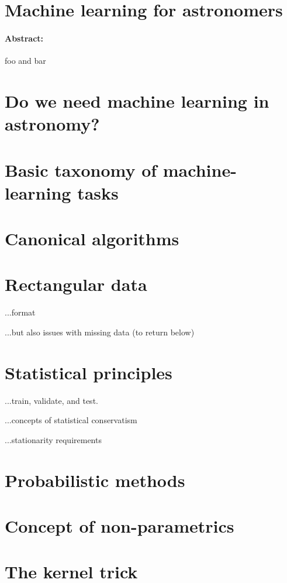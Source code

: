\documentclass[12pt, letterpaper]{article}
\begin{document}
\section*{Machine learning for astronomers}

\paragraph{Abstract:} foo and bar

\section{Do we need machine learning in astronomy?}

\section{Basic taxonomy of machine-learning tasks}

\section{Canonical algorithms}

\section{Rectangular data}

...format

...but also issues with missing data (to return below)

\section{Statistical principles}

...train, validate, and test.

...concepts of statistical conservatism

...stationarity requirements

\section{Probabilistic methods}

\section{Concept of non-parametrics}

\section{The kernel trick}
\end{document}

